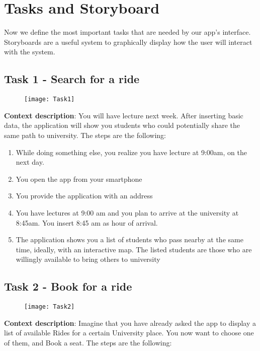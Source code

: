 \documentclass{article}
\begin{document}
\section{Tasks and Storyboard}
\graphicspath{{Doc images/Storyboards}}
Now we define the most important tasks that are needed by our app’s interface. Storyboards are a useful system to graphically display how the user will interact with the system.

\subsection{Task 1 - Search for a ride}

\begin{figure}[htbp]
  \centering
     \texttt{[image: Task1]}
\end{figure}

\textbf{Context description}: You will have lecture next week. After inserting basic data, the application will show you students who could potentially share the same path to university. The steps are the following:

\begin{enumerate}
    \item While doing something else, you realize you have lecture at 9:00am, on the next day. 
    \item You open the app from your smartphone 
    \item You provide the application with an address 
    \item You have lectures at 9:00 am and you plan to arrive at the university at 8:45am. You insert 8:45 am as hour of arrival.
    \item The application shows you a list of students who pass nearby at the same time, ideally, with an interactive map. The listed students are those who are willingly available to bring others to university
\end{enumerate}

\subsection{Task 2 - Book for a ride}

\begin{figure}[ht!]
  \centering
     \texttt{[image: Task2]}
\end{figure}


\textbf{Context description}: Imagine that you have already asked the app to display a list of available Rides for a certain University place. You now want to choose one of them, and Book a seat. The steps are the following:
\end{document}
